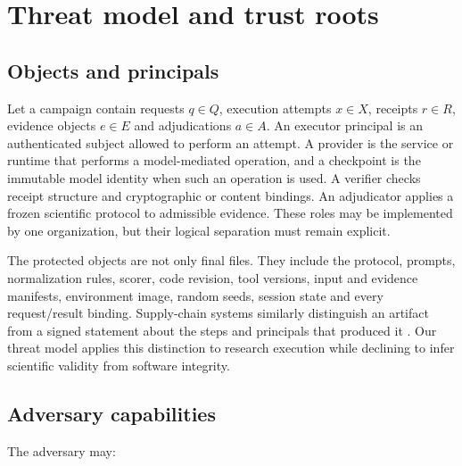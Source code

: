 \section{Threat model and trust roots}

\subsection{Objects and principals}

Let a campaign contain requests $q\in Q$, execution attempts $x\in X$, receipts
$r\in R$, evidence objects $e\in E$ and adjudications $a\in A$. An executor
principal is an authenticated subject allowed to perform an attempt. A provider is
the service or runtime that performs a model-mediated operation, and a checkpoint
is the immutable model identity when such an operation is used. A verifier checks
receipt structure and cryptographic or content bindings. An adjudicator applies a
frozen scientific protocol to admissible evidence. These roles may be implemented
by one organization, but their logical separation must remain explicit.

The protected objects are not only final files. They include the protocol, prompts,
normalization rules, scorer, code revision, tool versions, input and evidence
manifests, environment image, random seeds, session state and every request/result
binding. Supply-chain systems similarly distinguish an artifact from a signed
statement about the steps and principals that produced it
\citep{torresarias2019intoto,slsa2026provenance}. Our threat model applies this
distinction to research execution while declining to infer scientific validity from
software integrity.

\subsection{Adversary capabilities}

The adversary may:

